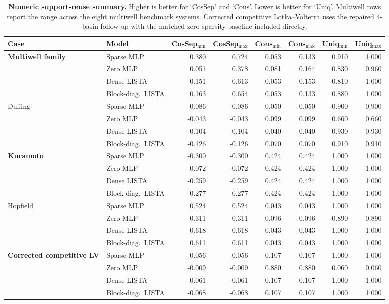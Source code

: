 \begin{table}[ht]
\centering
\scriptsize
\setlength{\tabcolsep}{5pt}
\begin{tabular}{p{}p{}rrrrrr}
\toprule
Case & Model & CosSep$_{\min}$ & CosSep$_{\max}$ & Cons$_{\min}$ & Cons$_{\max}$ & Uniq$_{\min}$ & Uniq$_{\max}$ \\
\midrule
\textbf{Multiwell family} & Sparse MLP & 0.380 & 0.724 & 0.053 & 0.133 & 0.910 & 1.000 \\
& Zero MLP & 0.051 & 0.378 & 0.081 & 0.164 & 0.830 & 0.960 \\
& Dense LISTA & 0.151 & 0.613 & 0.053 & 0.153 & 0.810 & 1.000 \\
& Block-diag.\ LISTA & 0.163 & 0.654 & 0.053 & 0.133 & 0.880 & 1.000 \\
\midrule
Duffing & Sparse MLP & -0.086 & -0.086 & 0.050 & 0.050 & 0.900 & 0.900 \\
& Zero MLP & -0.043 & -0.043 & 0.099 & 0.099 & 0.660 & 0.660 \\
& Dense LISTA & -0.104 & -0.104 & 0.040 & 0.040 & 0.930 & 0.930 \\
& Block-diag.\ LISTA & -0.126 & -0.126 & 0.070 & 0.070 & 0.910 & 0.910 \\
\midrule
\textbf{Kuramoto} & Sparse MLP & -0.300 & -0.300 & 0.424 & 0.424 & 1.000 & 1.000 \\
& Zero MLP & -0.072 & -0.072 & 0.424 & 0.424 & 1.000 & 1.000 \\
& Dense LISTA & -0.259 & -0.259 & 0.424 & 0.424 & 1.000 & 1.000 \\
& Block-diag.\ LISTA & -0.277 & -0.277 & 0.424 & 0.424 & 1.000 & 1.000 \\
\midrule
Hopfield & Sparse MLP & 0.524 & 0.524 & 0.043 & 0.043 & 1.000 & 1.000 \\
& Zero MLP & 0.311 & 0.311 & 0.096 & 0.096 & 0.890 & 0.890 \\
& Dense LISTA & 0.618 & 0.618 & 0.043 & 0.043 & 1.000 & 1.000 \\
& Block-diag.\ LISTA & 0.611 & 0.611 & 0.043 & 0.043 & 1.000 & 1.000 \\
\midrule
\textbf{Corrected competitive LV} & Sparse MLP & -0.056 & -0.056 & 0.107 & 0.107 & 1.000 & 1.000 \\
& Zero MLP & -0.009 & -0.009 & 0.880 & 0.880 & 0.060 & 0.060 \\
& Dense LISTA & -0.061 & -0.061 & 0.107 & 0.107 & 1.000 & 1.000 \\
& Block-diag.\ LISTA & -0.068 & -0.068 & 0.107 & 0.107 & 1.000 & 1.000 \\
\bottomrule
\end{tabular}
\caption{\textbf{Numeric support-reuse summary.} Higher is better for `CosSep' and `Cons'. Lower is better for `Uniq'. Multiwell rows report the range across the eight multiwell benchmark systems. Corrected competitive Lotka--Volterra uses the repaired 4-basin follow-up with the matched zero-sparsity baseline included directly.}
\label{tab:review-mechanism-main-20260314}
\end{table}

